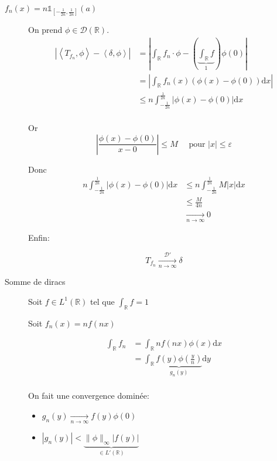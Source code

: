 \documentclass{article}
\newcommand{\R}{\mathbb{R}}
\newcommand{\dx}{\mathrm{d}x}
\begin{document}
	\begin{description}
		\item[$f_n(x) = n \mathbb{1}_{[-\frac{1}{2n}, \frac{1}{2n}]}(a)$] 

			On prend $\phi\in \mathcal{D}(\R)$.
		\begin{align*}
			|\left<T_{f_n}, \phi \right> - \left<\delta, \phi \right>| &= \left|\int_\R f_n  \cdot \phi - \left( \underbrace{\int_\R f}_{1} \right) \phi(0)\right| \\
			&= \left|\int_\R f_n(x) (\phi(x) - \phi(0)) \dx \right|\\
			&\le n \int_{-\frac{1}{2n}}^{\frac{1}{2n}} | \phi(x) - \phi(0)| \dx\\
		\end{align*}

		Or \[
			\left| \frac{\phi(x) - \phi(0)}{x-0} \right| \le  M \quad \text{ pour } |x| \le \varepsilon
		\] 

		Donc \begin{align*}
			n \int_{-\frac{1}{2n}}^{\frac{1}{2n}} | \phi(x) - \phi(0)| \dx &\le n \int_{-\frac{1}{2n}}^{\frac{1}{2n}} M|x| \dx \\
										       &\le \frac{M}{4n} \\
										       &\xrightarrow[n\to \infty]{} 0
		\end{align*}

		Enfin:

		\[
			T_{f_n} \xrightarrow[n \to \infty]{\mathcal{D}'} \delta

			
		\] 

		\item[Somme de diracs] 
			Soit $f\in L^1(\R)$ tel que $\int_\R f = 1$

			Soit $f_n(x) = nf(nx)$ 

			\begin{align*}
				\int_\R f_n &= \int_{\R} nf(nx) \phi(x) \dx \\
					    &= \int_\R \underbrace{f(y) \phi(\frac{y}{n})}_{g_n(y)} \mathrm{d}y \\
			\end{align*}

			On fait une convergence dominée:

			\begin{itemize}
				\item $g_n(y) \xrightarrow[n\to \infty]{} f(y) \phi(0)$ 
				\item $|g_n(y)| < \underbrace{\|\phi\|_{\infty} |f(y)|}_{\in L'(\R)}$ 
			\end{itemize}


\end{description}
\end{document}
